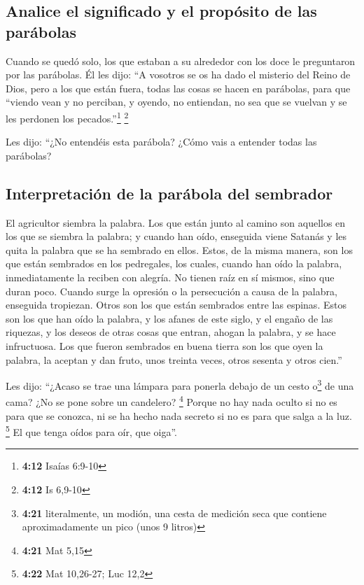 \hypertarget{analice-el-significado-y-el-propuxf3sito-de-las-paruxe1bolas}{%
\subsection{Analice el significado y el propósito de las
parábolas}\label{analice-el-significado-y-el-propuxf3sito-de-las-paruxe1bolas}}

 Cuando se quedó solo, los que estaban a su alrededor con
los doce le preguntaron por las parábolas.  Él les dijo:
``A vosotros se os ha dado el misterio del Reino de Dios, pero a los que
están fuera, todas las cosas se hacen en parábolas,  para
que ``viendo vean y no perciban, y oyendo, no entiendan, no sea que se
vuelvan y se les perdonen los pecados.''\footnote{\textbf{4:12} Isaías
  6:9-10} \footnote{\textbf{4:12} Is 6,9-10}

 Les dijo: ``¿No entendéis esta parábola? ¿Cómo vais a
entender todas las parábolas?

\hypertarget{interpretaciuxf3n-de-la-paruxe1bola-del-sembrador}{%
\subsection{Interpretación de la parábola del
sembrador}\label{interpretaciuxf3n-de-la-paruxe1bola-del-sembrador}}

 El agricultor siembra la palabra.  Los
que están junto al camino son aquellos en los que se siembra la palabra;
y cuando han oído, enseguida viene Satanás y les quita la palabra que se
ha sembrado en ellos.  Estos, de la misma manera, son los
que están sembrados en los pedregales, los cuales, cuando han oído la
palabra, inmediatamente la reciben con alegría.  No
tienen raíz en sí mismos, sino que duran poco. Cuando surge la opresión
o la persecución a causa de la palabra, enseguida tropiezan.
 Otros son los que están sembrados entre las espinas.
Estos son los que han oído la palabra,  y los afanes de
este siglo, y el engaño de las riquezas, y los deseos de otras cosas que
entran, ahogan la palabra, y se hace infructuosa.  Los
que fueron sembrados en buena tierra son los que oyen la palabra, la
aceptan y dan fruto, unos treinta veces, otros sesenta y otros cien.''

 Les dijo: ``¿Acaso se trae una lámpara para ponerla
debajo de un cesto o\footnote{\textbf{4:21} literalmente, un modión, una
  cesta de medición seca que contiene aproximadamente un pico (unos 9
  litros)} de una cama? ¿No se pone sobre un candelero? \footnote{\textbf{4:21}
  Mat 5,15}  Porque no hay nada oculto si no es para que
se conozca, ni se ha hecho nada secreto si no es para que salga a la
luz. \footnote{\textbf{4:22} Mat 10,26-27; Luc 12,2}  El
que tenga oídos para oír, que oiga''.


